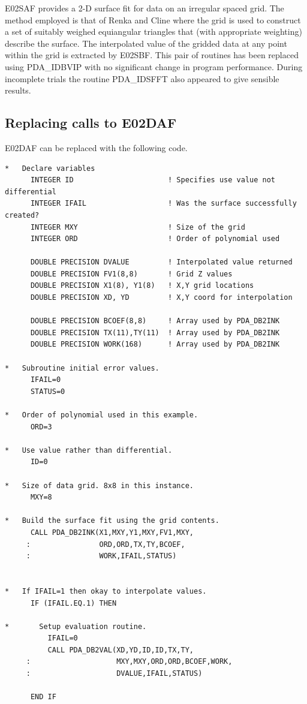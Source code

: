 \documentclass[11pt,twoside]{article}
\newcommand{\xlabel}[1]{}
\begin{document}
E02SAF provides a 2-D surface fit for data on an
irregular spaced grid. The method employed is that of Renka and 
Cline where the grid is used to construct a set of suitably 
weighed equiangular triangles that (with appropriate weighting) 
describe the surface. The interpolated value of the gridded data 
at any point within the grid is extracted by E02SBF. This pair of
routines has been replaced using PDA\_IDBVIP with no significant change
in program performance. During incomplete trials the routine PDA\_IDSFFT
also appeared to give sensible results.

\subsection{\xlabel{replacing_calls_to_e02daf}Replacing calls to E02DAF}

E02DAF can be replaced with the following code.

\begin{verbatim}
*   Declare variables
      INTEGER ID                      ! Specifies use value not differential
      INTEGER IFAIL                   ! Was the surface successfully created?
      INTEGER MXY                     ! Size of the grid
      INTEGER ORD                     ! Order of polynomial used

      DOUBLE PRECISION DVALUE         ! Interpolated value returned 
      DOUBLE PRECISION FV1(8,8)       ! Grid Z values
      DOUBLE PRECISION X1(8), Y1(8)   ! X,Y grid locations
      DOUBLE PRECISION XD, YD         ! X,Y coord for interpolation
 
      DOUBLE PRECISION BCOEF(8,8)     ! Array used by PDA_DB2INK
      DOUBLE PRECISION TX(11),TY(11)  ! Array used by PDA_DB2INK
      DOUBLE PRECISION WORK(168)      ! Array used by PDA_DB2INK
 
*   Subroutine initial error values. 
      IFAIL=0
      STATUS=0

*   Order of polynomial used in this example.
      ORD=3
 
*   Use value rather than differential.
      ID=0

*   Size of data grid. 8x8 in this instance.
      MXY=8
     
*   Build the surface fit using the grid contents.
      CALL PDA_DB2INK(X1,MXY,Y1,MXY,FV1,MXY,
     :                ORD,ORD,TX,TY,BCOEF,
     :                WORK,IFAIL,STATUS)
 

*   If IFAIL=1 then okay to interpolate values.
      IF (IFAIL.EQ.1) THEN
   
*       Setup evaluation routine.
          IFAIL=0
          CALL PDA_DB2VAL(XD,YD,ID,ID,TX,TY,
     :                    MXY,MXY,ORD,ORD,BCOEF,WORK,
     :                    DVALUE,IFAIL,STATUS)
 
      END IF
\end{verbatim}
\end{document}
